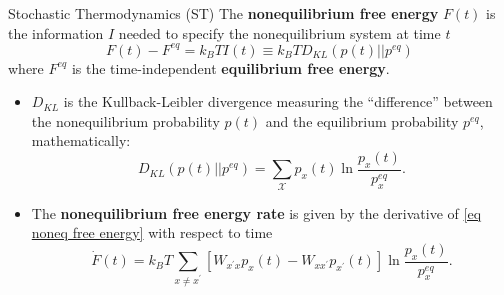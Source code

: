 \documentclass[final]{beamer}
\newlength{\colwidth}
\begin{document}
\begin{frame}[t]
\begin{columns}[t]
\begin{column}{\colwidth}
\begin{block}{Stochastic Thermodynamics (ST)}
%
The {\bf nonequilibrium free energy} ${F}(t)$ is the information $I$ needed to specify the nonequilibrium system at time $t$\cite{Esposito_2011}
%
\begin{equation}
{F}(t) - {F}^{eq} = k_B TI(t) \equiv k_B TD_{KL}(p(t) || p^{eq})
\label{eq noneq free energy}
\end{equation}
%
where ${F}^{eq}$ is the time-independent {\bf equilibrium free energy}.
\begin{itemize}
\justifying
\item $D_{KL}$ is the Kullback-Leibler divergence measuring the ``difference'' between the nonequilibrium probability $p(t)$ and the equilibrium probability $p^{eq}$, mathematically:
%
\begin{equation*}
D_{KL}(p(t) || p^{eq}) = \sum_{\mathcal{X}} p_x(t) \ln \frac{p_x(t)}{p_x^{eq}}.
\end{equation*}
\item The {\bf nonequilibrium free energy rate} is given by the derivative of \eqref{eq noneq free energy} with respect to time 
\begin{equation*}
\dot{F}(t) = k_B T \sum_{x \neq x^\prime} \left[ W_{x^\prime x} p_x(t) -  W_{x x^\prime}p_{x^\prime}(t) \right] \ln \frac{p_x(t)}{p_x^{eq}}.
\end{equation*}
\end{itemize}
\end{block}


\end{column}
\end{columns}
\end{frame}
\end{document}
